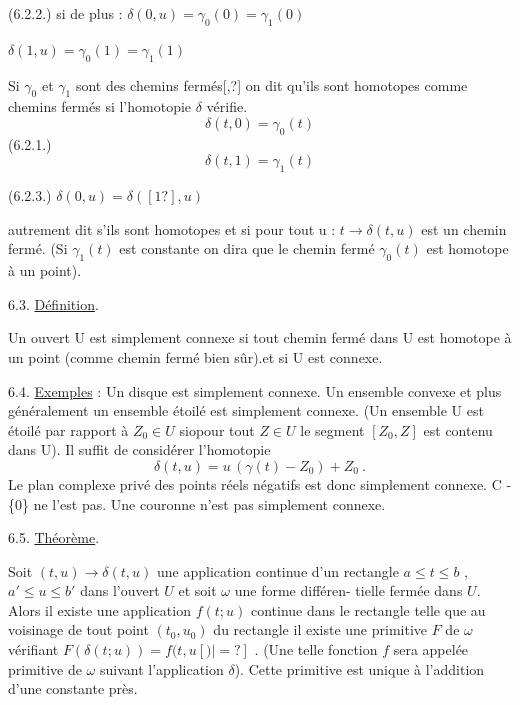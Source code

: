 \documentclass[11pt]{article}
\newcommand{\scanpage}[1]{\par\bigskip\noindent{\small\sffamily[scan #1]}\par}
\newcommand{\mspage}[1]{{\small\sffamily[p.\,#1]}}
\newcommand{\uline}[1]{\underline{#1}}
\newcommand{\unsure}[1]{[#1?]}
\begin{document}
(6.2.2.) \qquad si de plus : \qquad $\delta(0,u) = \gamma_0(0) = \gamma_1(0)$

\qquad\qquad $\delta(1,u) = \gamma_0(1) = \gamma_1(1)$

Si $\gamma_0$ et $\gamma_1$ sont des chemins fermés\unsure{,} on dit qu'ils sont homotopes comme
chemins fermés si l'homotopie $\delta$ vérifie.
\[ \delta(t,0) = \gamma_0(t) \]
(6.2.1.)
\[ \delta(t,1) = \gamma_1(t) \]

(6.2.3.) \qquad $\delta(0,u) = \delta(\unsure{1},u)$

autrement dit s'ils sont homotopes et si pour tout u : $t \to \delta(t,u)$ est un
chemin fermé. (Si $\gamma_1(t)$ est constante on dira que le chemin fermé $\gamma_0(t)$
est homotope à un point).

6.3. \uline{Définition}.

Un ouvert U est simplement connexe si tout chemin fermé dans U
est homotope à un point (comme chemin fermé bien sûr).et si U est connexe.

6.4. \uline{Exemples} : Un disque est simplement connexe. Un ensemble convexe et plus
généralement un ensemble étoilé est simplement connexe. (Un ensemble U est
étoilé par rapport à $Z_0 \in U$ siopour tout $Z \in U$ le segment $[Z_0,Z]$ est
contenu dans U). Il suffit de considérer l'homotopie
\[ \delta(t,u) = u\,(\gamma(t) - Z_0) + Z_0 \ . \]
Le plan complexe privé des points réels négatifs est donc simplement connexe.
C - \{0\} ne l'est pas. Une couronne n'est pas simplement connexe.

\mspage{177}

\clearpage
\scanpage{119/178}
\mspage{- 17 -}

6.5. \uline{Théorème}.

Soit $(t,u) \to \delta(t,u)$ une application continue d'un rectangle
$a \leq t \leq b$ , $a' \leq u \leq b'$ dans l'ouvert $U$ et soit $\omega$ une forme différen-%
tielle fermée dans $U$. Alors il existe une application $f(t;u)$ continue dans
le rectangle telle que au voisinage de tout point $(t_0,u_0)$ du rectangle
il existe une primitive $F$ de $\omega$ vérifiant $F(\delta(t;u)) = f(t,u\unsure{)|=}$ .
(Une telle fonction $f$ sera appelée primitive de $\omega$ suivant l'application $\delta$).
Cette primitive est unique à l'addition d'une constante près.
\end{document}
